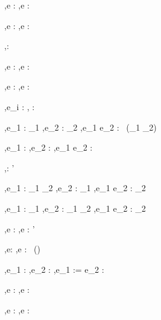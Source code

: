     {\Gamma,\Sigma \infers e : \List\tau}
    {\Gamma,\Sigma \infers \Tail e : \List\tau}


  {\Gamma,\Sigma \infers e : \tau}
  {\Gamma,\Sigma \infers \Done e : \Task \tau}

  {}
  {\Gamma,\Sigma \infers \Enter \beta : \Task \beta}

  {\Gamma,\Sigma \infers e : \beta}
  {\Gamma,\Sigma \infers \Update e : \Task \beta}

  {\Gamma,\Sigma \infers e : \beta}
  {\Gamma,\Sigma \infers \View e : \Task \beta}

  { \Quad
   \Gamma,\Sigma \infers e_i : \Task \tau}
  {\Gamma,\Sigma \infers \Pick {} : \Task \tau}


  {\Gamma,\Sigma \infers e_1 : \Task \tau_1 \Quad
   \Gamma,\Sigma \infers e_2 : \Task \tau_2}
  {\Gamma,\Sigma \infers e_1 \Pair e_2 : \Task\ (\tau_1 \times \tau_2)}

  {\Gamma,\Sigma \infers e_1 : \Task \tau \Quad
   \Gamma,\Sigma \infers e_2 : \Task \tau}
  {\Gamma,\Sigma \infers e_1 \Choose e_2 : \Task \tau}

  {}
  {\Gamma,\Sigma \infers \Fail : \Task \tau'}


  {\Gamma,\Sigma \infers e_1 : \tau_1 \to \tau_2 \Quad
   \Gamma,\Sigma \infers e_2 : \Task \tau_1}
  {\Gamma,\Sigma \infers e_1 \Trans e_2 : \Task \tau_2}

  {\Gamma,\Sigma \infers e_1 : \Task \tau_1 \Quad
   \Gamma,\Sigma \infers e_2 : \tau_1 \to \Task \tau_2}
  {\Gamma,\Sigma \infers e_1 \Step e_2 : \Task \tau_2}

  {\Gamma,\Sigma \infers e : \Task \tau}
  {\Gamma,\Sigma \infers \Forever e : \Task \tau'}


  {\Gamma,\Sigma \infers e: \beta}
  {\Gamma,\Sigma \infers \New e : \Task\ (\Reference \beta)}

  {\Gamma,\Sigma \infers e_1 : \Reference \beta \Quad
   \Gamma,\Sigma \infers e_2 : \beta}
  {\Gamma,\Sigma \infers e_1 := e_2 : \Task \Unit}

  {\Gamma,\Sigma \infers e : \Reference \beta}
  {\Gamma,\Sigma \infers \Change e : \Task \beta}

  {\Gamma,\Sigma \infers e : \Reference \beta}
  {\Gamma,\Sigma \infers \Watch e : \Task \beta}



